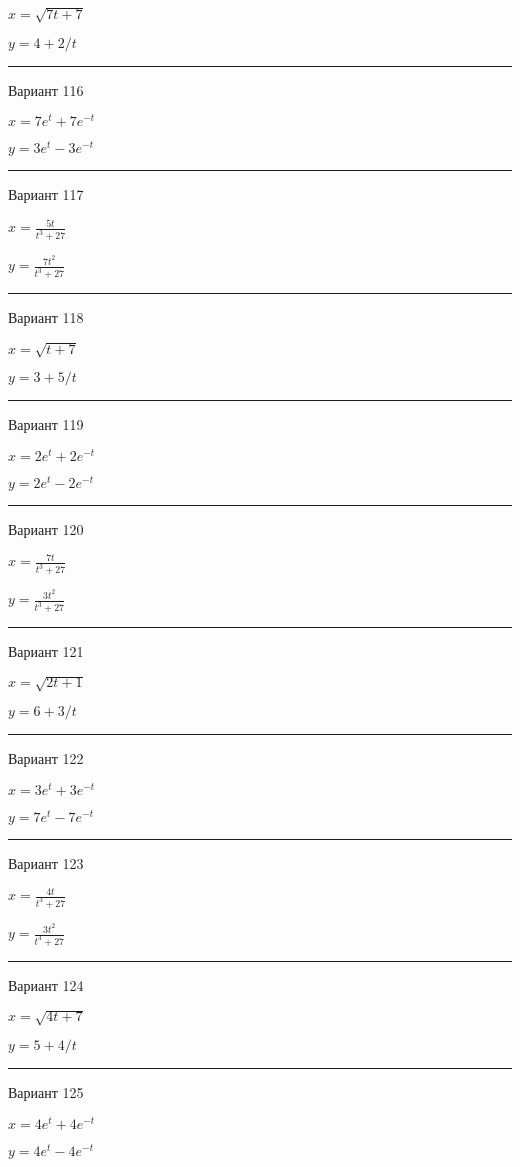 \documentclass[11pt]{report}
\begin{document}
$x = \sqrt{7 t + 7}$

$y = 4 + 2 / t$

\rule{\textwidth}{.2mm}

 Вариант 116

$x = 7 e^{t} + 7 e^{- t}$

$y = 3 e^{t} - 3 e^{- t}$

\rule{\textwidth}{.2mm}

 Вариант 117

$x = \frac{5 t}{t^{3} + 27}$

$y = \frac{7 t^{2}}{t^{3} + 27}$

\rule{\textwidth}{.2mm}

 Вариант 118

$x = \sqrt{t + 7}$

$y = 3 + 5 / t$

\rule{\textwidth}{.2mm}

 Вариант 119

$x = 2 e^{t} + 2 e^{- t}$

$y = 2 e^{t} - 2 e^{- t}$

\rule{\textwidth}{.2mm}

 Вариант 120

$x = \frac{7 t}{t^{3} + 27}$

$y = \frac{3 t^{2}}{t^{3} + 27}$

\rule{\textwidth}{.2mm}

 Вариант 121

$x = \sqrt{2 t + 1}$

$y = 6 + 3 / t$

\rule{\textwidth}{.2mm}

 Вариант 122

$x = 3 e^{t} + 3 e^{- t}$

$y = 7 e^{t} - 7 e^{- t}$

\rule{\textwidth}{.2mm}

 Вариант 123

$x = \frac{4 t}{t^{3} + 27}$

$y = \frac{3 t^{2}}{t^{3} + 27}$

\rule{\textwidth}{.2mm}

 Вариант 124

$x = \sqrt{4 t + 7}$

$y = 5 + 4 / t$

\rule{\textwidth}{.2mm}

 Вариант 125

$x = 4 e^{t} + 4 e^{- t}$

$y = 4 e^{t} - 4 e^{- t}$
\end{document}
